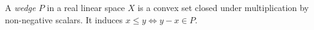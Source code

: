 A \emph{wedge} $P$ in a real linear space $X$ is a convex set closed under multiplication by non-negative scalars. It induces $x\leqslant y\Leftrightarrow y-x\in P$.
